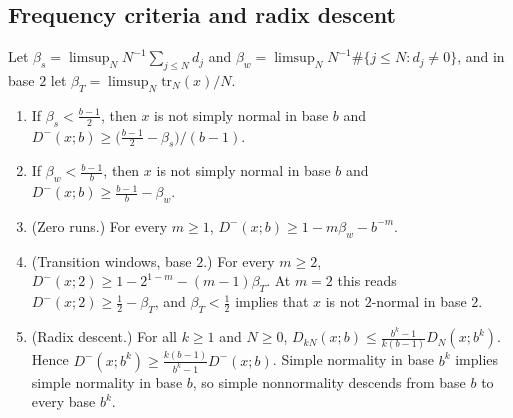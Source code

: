 \documentclass[11pt]{article}
\newcommand{\tr}{\mathrm{tr}}
\begin{document}
\subsection{Frequency criteria and radix descent}

\begin{proposition}\label{prop:criteria}
Let $\beta_s=\limsup_NN^{-1}\sum_{j\le N}d_j$ and $\beta_w=\limsup_NN^{-1}\#\{j\le N:d_j\ne0\}$, and in base $2$ let $\beta_T=\limsup_N\tr_N(x)/N$.
\begin{enumerate}[label=\textup{(\arabic*)},nosep]
\item If $\beta_s<\frac{b-1}2$, then $x$ is not simply normal in base $b$ and $D^-(x;b)\ge\bigl(\frac{b-1}2-\beta_s\bigr)/(b-1)$.
\item If $\beta_w<\frac{b-1}b$, then $x$ is not simply normal in base $b$ and $D^-(x;b)\ge\frac{b-1}b-\beta_w$.
\item \textup{(Zero runs.)} For every $m\ge1$, $D^-(x;b)\ge1-m\beta_w-b^{-m}$.
\item \textup{(Transition windows, base $2$.)} For every $m\ge2$, $D^-(x;2)\ge1-2^{1-m}-(m-1)\beta_T$. At $m=2$ this reads $D^-(x;2)\ge\frac12-\beta_T$, and $\beta_T<\frac12$ implies that $x$ is not $2$-normal in base $2$.
\item \textup{(Radix descent.)} For all $k\ge1$ and $N\ge0$, $D_{kN}(x;b)\le\frac{b^k-1}{k(b-1)}D_N(x;b^k)$. Hence $D^-(x;b^k)\ge\frac{k(b-1)}{b^k-1}D^-(x;b)$. Simple normality in base $b^k$ implies simple normality in base $b$, so simple nonnormality descends from base $b$ to every base $b^k$.
\end{enumerate}
\end{proposition}
\end{document}
